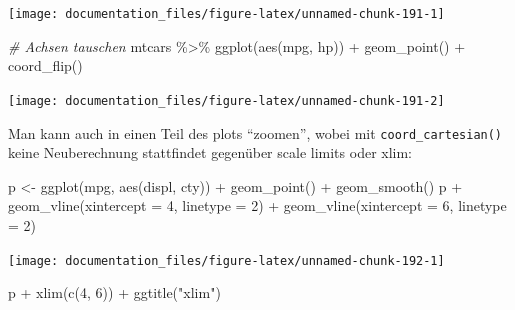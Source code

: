 \documentclass[
]{article}
\newenvironment{Shaded}{\begin{snugshade}}{\end{snugshade}}
\newcommand{\AttributeTok}[1]{\textcolor[rgb]{0.77,0.63,0.00}{#1}}
\newcommand{\CommentTok}[1]{\textcolor[rgb]{0.56,0.35,0.01}{\textit{#1}}}
\newcommand{\DecValTok}[1]{\textcolor[rgb]{0.00,0.00,0.81}{#1}}
\newcommand{\FunctionTok}[1]{\textcolor[rgb]{0.00,0.00,0.00}{#1}}
\newcommand{\NormalTok}[1]{#1}
\newcommand{\OtherTok}[1]{\textcolor[rgb]{0.56,0.35,0.01}{#1}}
\newcommand{\SpecialCharTok}[1]{\textcolor[rgb]{0.00,0.00,0.00}{#1}}
\newcommand{\StringTok}[1]{\textcolor[rgb]{0.31,0.60,0.02}{#1}}
\begin{document}
\begin{center}\texttt{[image: documentation\_files/figure-latex/unnamed-chunk-191-1]} \end{center}

\begin{Shaded}
\begin{Highlighting}[]
\CommentTok{\# Achsen tauschen}
\NormalTok{mtcars }\SpecialCharTok{\%\textgreater{}\%}
  \FunctionTok{ggplot}\NormalTok{(}\FunctionTok{aes}\NormalTok{(mpg, hp)) }\SpecialCharTok{+}
  \FunctionTok{geom\_point}\NormalTok{() }\SpecialCharTok{+}
  \FunctionTok{coord\_flip}\NormalTok{()}
\end{Highlighting}
\end{Shaded}

\begin{center}\texttt{[image: documentation\_files/figure-latex/unnamed-chunk-191-2]} \end{center}

Man kann auch in einen Teil des plots ``zoomen'', wobei mit \texttt{coord\_cartesian()} keine Neuberechnung stattfindet gegenüber scale limits oder xlim:

\begin{Shaded}
\begin{Highlighting}[]
\NormalTok{p }\OtherTok{\textless{}{-}} \FunctionTok{ggplot}\NormalTok{(mpg, }\FunctionTok{aes}\NormalTok{(displ, cty)) }\SpecialCharTok{+} \FunctionTok{geom\_point}\NormalTok{() }\SpecialCharTok{+} \FunctionTok{geom\_smooth}\NormalTok{()}
\NormalTok{p }\SpecialCharTok{+} \FunctionTok{geom\_vline}\NormalTok{(}\AttributeTok{xintercept =} \DecValTok{4}\NormalTok{, }\AttributeTok{linetype =} \DecValTok{2}\NormalTok{) }\SpecialCharTok{+} \FunctionTok{geom\_vline}\NormalTok{(}\AttributeTok{xintercept =} \DecValTok{6}\NormalTok{, }\AttributeTok{linetype =} \DecValTok{2}\NormalTok{)}
\end{Highlighting}
\end{Shaded}

\begin{center}\texttt{[image: documentation\_files/figure-latex/unnamed-chunk-192-1]} \end{center}

\begin{Shaded}
\begin{Highlighting}[]
\NormalTok{p }\SpecialCharTok{+} \FunctionTok{xlim}\NormalTok{(}\FunctionTok{c}\NormalTok{(}\DecValTok{4}\NormalTok{, }\DecValTok{6}\NormalTok{)) }\SpecialCharTok{+} \FunctionTok{ggtitle}\NormalTok{(}\StringTok{"xlim"}\NormalTok{)}
\end{Highlighting}
\end{Shaded}
\end{document}
